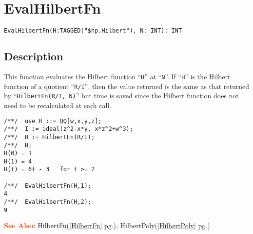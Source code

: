 \documentclass[a4paper]{mybook}
\newenvironment{command}{}{} %
\newcommand\SeeAlso{\par\textcolor{OrangeRed}{\textbf{\large See Also: }}}
\begin{document}
\section{EvalHilbertFn}
\label{EvalHilbertFn}
\begin{command} %


\begin{Verbatim}[label=syntax, rulecolor=\color{MidnightBlue},
frame=single]
EvalHilbertFn(H:TAGGED("$hp.Hilbert"), N: INT): INT
\end{Verbatim}


\subsection*{Description}

This function evaluates the Hilbert function ``\verb&H&'' at ``\verb&N&''.  If ``\verb&H&'' is the
Hilbert function of a quotient ``\verb&R/I&'', then the value returned is the
same as that returned by ``\verb&HilbertFn(R/I, N)&'' but time is saved
since the Hilbert function does not need to be recalculated at each call.
\begin{Verbatim}[label=example, rulecolor=\color{PineGreen}, frame=single]
/**/  use R ::= QQ[w,x,y,z];
/**/  I := ideal(z^2-x*y, x*z^2+w^3);
/**/  H := HilbertFn(R/I);
/**/  H;
H(0) = 1
H(1) = 4
H(t) = 6t - 3   for t >= 2

/**/  EvalHilbertFn(H,1);
4
/**/  EvalHilbertFn(H,2);
9
\end{Verbatim}


\SeeAlso %
  HilbertFn(\ref{HilbertFn} pg.\pageref{HilbertFn}), 
    HilbertPoly(\ref{HilbertPoly} pg.\pageref{HilbertPoly})
\end{command} %
\end{document}
